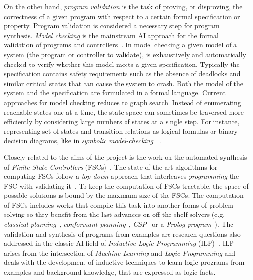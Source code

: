 \documentclass[10pt,a4paper]{paper}
\begin{document}
On the other hand, {\em program validation} is the task of proving, or disproving, the correctness of a given program with respect to a certain formal specification or property. Program validation is considered a necessary step for program synthesis. {\em Model checking} is the mainstream AI approach for the formal validation of programs and controllers~\cite{clarke1999model}. In model checking a given model of a system (the program or controller to validate), is exhaustively and automatically checked to verify  whether this model meets a given specification. Typically the specification contains safety requirements such as the absence of deadlocks and similar critical states that can cause the system to crash. Both the model of the system and the specification are formulated in a formal language.  Current approaches for model checking reduces to graph search. Instead of enumerating reachable states one at a time, the state space can sometimes be traversed more efficiently by considering large numbers of states at a single step. For instance, representing set of states and transition relations as logical formulas or binary decision diagrams, like in {\em symbolic model-checking} ~\cite{mcmillan1993symbolic}.

Closely related to the aims of the project is the work on the automated synthesis of {\it Finite State Controllers} (FSCs)~\cite{geffner:policies:IJCAI15}. The state-of-the-art algorithms for computing FSCs follow a {\it top-down} approach that interleaves {\it programming} the FSC with validating it~\cite{sergio:aprograming:ijcai16}. To keep the computation of FSCs tractable, the space of possible solutions is bound by the maximum size of the FSCs. The computation of FSCs includes works that compile this task into another forms of problem solving so they benefit from the last advances on off-the-shelf solvers (e.g. {\em classical planning}~\cite{sergio:aprograming:icaps16}, {\em conformant planning}~\cite{Geffner:FSM:AAAI10}, {\em CSP}~\cite{Infantes:FSC:ECAI2010} or a {\em Prolog program}~\cite{Giacomo:FSM:ICAPS13}). The validation and synthesis of programs from examples are research questions also addressed in the classic AI field of {\em Inductive Logic Programming} (ILP)~\cite{muggleton1991inductive,Raedt:relationalML:book2008}. ILP arises from the intersection of {\em Machine Learning} and {\em Logic Programming} and deals with the development of inductive techniques to learn logic programs from  examples and background knowledge, that are expressed as logic facts.
\end{document}
